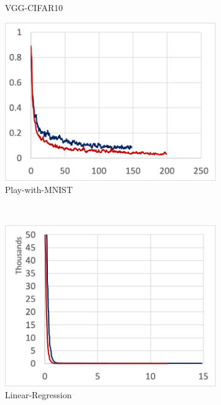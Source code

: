 \begin{figure}
\begin{subfigure}[t]{.24\textwidth}
    \caption{VGG-CIFAR10}
  \end{subfigure}
  \par\bigskip
  \begin{subfigure}[t]{.24\textwidth}
    \includegraphics[width=\textwidth]{tf2-03}
    \caption{Play-with-MNIST}
  \end{subfigure}
  ~
  \begin{subfigure}[t]{.24\textwidth}
    \includegraphics[width=\textwidth]{tf2-04}
    \caption{Linear-Regression}
  \end{subfigure} 
  ~ 
  \begin{subfigure}[t]{.24\textwidth}

\end{subfigure}
\end{figure}
